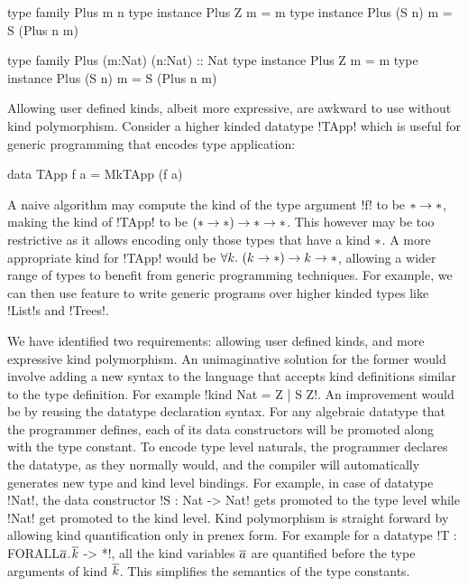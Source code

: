 \documentclass[screen,nonacm,manuscript,review]{acmart} %
\begin{document}
\begin{minipage}[ht]{0.4\linewidth}
\begin{code}
     type family Plus m n
     type instance Plus Z m = m
     type instance Plus (S n) m = S (Plus n m)
\end{code}
\end{minipage}
\begin{minipage}[ht]{0.4\linewidth}
\begin{code}
     type family Plus (m:Nat) (n:Nat) :: Nat
     type instance Plus Z m = m
     type instance Plus (S n) m = S (Plus n m)
\end{code}
\end{minipage}

Allowing user defined kinds, albeit more expressive, are awkward to use without kind polymorphism. Consider a higher kinded datatype !TApp! which is useful for generic programming that encodes type application:

\begin{CenteredBox}
\begin{code}
data TApp f a = MkTApp (f a)
\end{code}
\end{CenteredBox}

A naive algorithm may compute the kind of the type argument !f! to be $\ast \to \ast$, making the kind of !TApp! to be $(\ast \to \ast) \to \ast \to \ast$. This however may be too restrictive as it allows encoding only those types that have a kind $\ast$. A more appropriate kind for !TApp! would be $\forall k.~(k\to\ast) \to k \to \ast$, allowing a wider range of types to benefit from generic programming techniques. For example, we can then use feature to write generic programs over higher kinded types like !List!s and !Trees!\cite{magalhaes_generic_2010}.

We have identified two requirements: allowing user defined kinds, and
more expressive kind polymorphism. An unimaginative solution for the former would involve adding a new syntax to the language that accepts kind definitions similar to the type definition. For example !kind Nat = Z | S Z!. An improvement would be by reusing the datatype declaration syntax. For any algebraic datatype that the programmer defines, each of its data constructors will be promoted along with the type constant. To encode type level naturals, the programmer declares the datatype, as they normally would, and the compiler will automatically generates new type and kind level bindings. For example, in case of datatype !Nat!, the data constructor !S : Nat -> Nat! gets promoted to the type level while !Nat! get promoted to the kind level. Kind polymorphism is straight forward by allowing kind quantification only in prenex form. For example for a datatype !T : FORALL$\overline{a}$.$\overline{k}$ -> *!, all the kind variables $\overline{a}$ are quantified before the type arguments of kind $\overline{k}$. This simplifies the semantics of the type constants.
\end{document}
